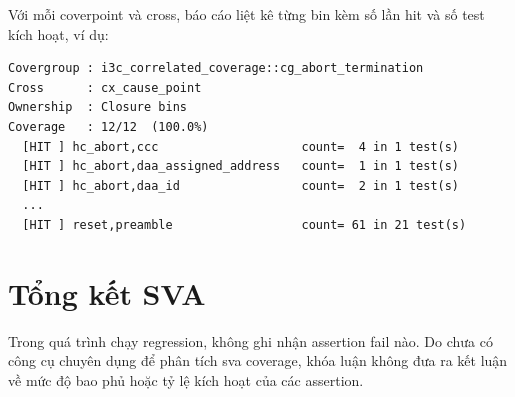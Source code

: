 Với mỗi coverpoint và cross, báo cáo liệt kê từng bin kèm số lần hit và số test kích hoạt, ví dụ:

\begin{lstlisting}
Covergroup : i3c_correlated_coverage::cg_abort_termination
Cross      : cx_cause_point
Ownership  : Closure bins
Coverage   : 12/12  (100.0%)
  [HIT ] hc_abort,ccc                    count=  4 in 1 test(s)
  [HIT ] hc_abort,daa_assigned_address   count=  1 in 1 test(s)
  [HIT ] hc_abort,daa_id                 count=  2 in 1 test(s)
  ...
  [HIT ] reset,preamble                  count= 61 in 21 test(s)
\end{lstlisting}

\section*{Tổng kết SVA}

Trong quá trình chạy regression, không ghi nhận assertion fail nào. Do chưa có
công cụ chuyên dụng để phân tích \gls{sva} coverage,
khóa luận không đưa ra kết luận về mức độ bao phủ hoặc tỷ lệ kích hoạt của các
assertion.
